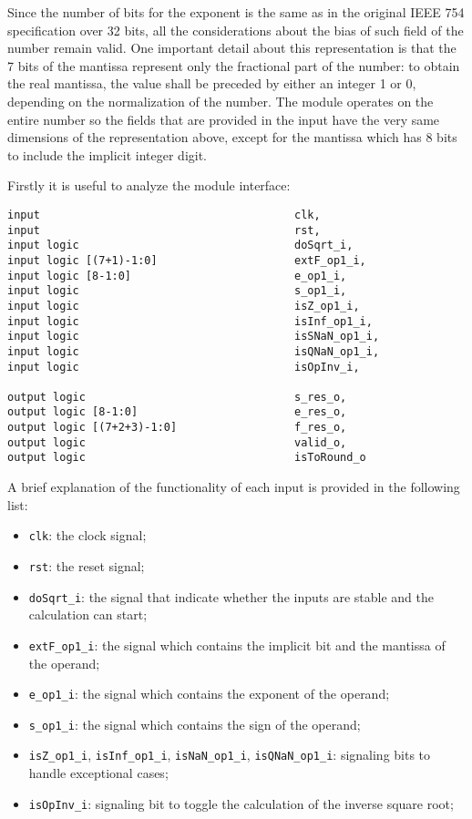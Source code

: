 \documentclass[paper=letter, fontsize=12pt]{article}
\begin{document}
Since the number of bits for the exponent is the same as in the original IEEE 754 specification over 32 bits, all the considerations about the bias of such field of the number remain valid.\newline
One important detail about this representation is that the 7 bits of the mantissa represent only the fractional part of the number: to obtain the real mantissa, the value shall be preceded by either an integer 1 or 0, depending on the normalization of the number. 
The module operates on the entire number so the fields that are provided in the input have the very same dimensions of the representation above, except for the mantissa which has 8 bits to include the implicit integer digit.

Firstly it is useful to analyze the module interface:
\begin{lstlisting}
input                                       clk,
input                                       rst, 
input logic                                 doSqrt_i,
input logic [(7+1)-1:0]                     extF_op1_i,
input logic [8-1:0]                         e_op1_i,
input logic                                 s_op1_i,
input logic                                 isZ_op1_i,
input logic                                 isInf_op1_i,
input logic                                 isSNaN_op1_i,
input logic                                 isQNaN_op1_i,
input logic                                 isOpInv_i,

output logic                                s_res_o,
output logic [8-1:0]                        e_res_o,
output logic [(7+2+3)-1:0]                  f_res_o,	
output logic                                valid_o,
output logic                                isToRound_o
\end{lstlisting}
A brief explanation of the functionality of each input is provided in the following list:
\begin{itemize}
    \item \texttt{clk}: the clock signal;
    \item \texttt{rst}: the reset signal;
    \item \texttt{doSqrt\_i}: the signal that indicate whether the inputs are stable and the calculation can start;
    \item \texttt{extF\_op1\_i}: the signal which contains the implicit bit and the mantissa of the operand;
    \item \texttt{e\_op1\_i}: the signal which contains the exponent of the operand;
    \item \texttt{s\_op1\_i}: the signal which contains the sign of the operand;
    \item \texttt{isZ\_op1\_i}, \texttt{isInf\_op1\_i}, \texttt{isNaN\_op1\_i}, \texttt{isQNaN\_op1\_i}: signaling bits to handle exceptional cases;
    \item \texttt{isOpInv\_i}: signaling bit to toggle the calculation of the inverse square root;
\end{itemize}
\end{document}
